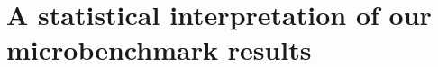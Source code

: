 \documentclass[conference]{IEEEtran}
\begin{document}
\label{sec:stats}
\section{A statistical interpretation of our microbenchmark results}

\end{document}
